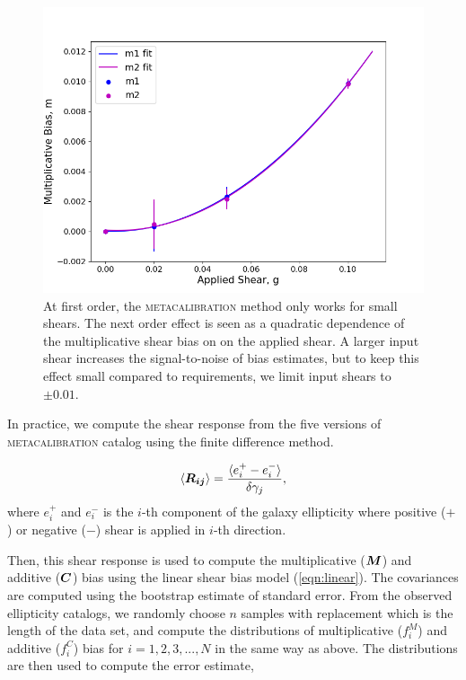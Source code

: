 \documentclass[fleqn,usenatbib]{mnras}
\begin{document}
\begin{figure}
	\includegraphics[width=\columnwidth]{metacal_bias_shear.png}
    \caption{At first order, the \textsc{metacalibration} method only works for small shears. The next order effect is seen as a quadratic dependence of the multiplicative shear bias on on the applied shear. A larger input shear increases the signal-to-noise of bias estimates, but to keep this effect small compared to requirements, we limit input shears to $\pm 0.01$.}
    \label{fig:metacal_shear_linear}
\end{figure}


In practice, we compute the shear response from the five versions of \textsc{metacalibration} catalog using the finite difference method. 

\begin{equation}
    \langle\vb*{R_{ij}}\rangle = 
    \frac{\langle e^{+}_{i} - e^{-}_{i} \rangle}{\delta\gamma_{j}}, 
\end{equation}
where $e^{+}_{i}$ and $e^{-}_{i}$ is the $i$-th component of the galaxy ellipticity where positive ($+$) or negative ($-$) shear is applied in $i$-th direction. 


Then, this shear response is used to compute the multiplicative ($\vb*{M}$) and additive ($\vb*{C}$) bias using the linear shear bias model (\ref{eqn:linear}). The covariances are computed using the bootstrap estimate of standard error. From the observed ellipticity catalogs, we randomly choose $n$ samples with replacement which is the length of the data set, and compute the distributions of multiplicative ($f^{M}_{i}$) and additive ($f^{C}_{i}$) bias for $i=1,2,3,...,N$ in the same way as above. The distributions are then used to compute the error estimate,  
\end{document}
